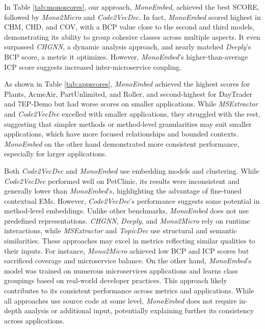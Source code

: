 In Table \ref{tab:monoscores}, our approach, \textit{MonoEmbed}, achieved the best SCORE, followed by \textit{Mono2Micro} and \textit{Code2VecDec}. In fact, \textit{MonoEmbed} scored highest in CHM, CHD, and COV, with a BCP value close to the second and third models, demonstrating its ability to group cohesive classes across multiple aspects. It even surpassed \textit{CHGNN}, a dynamic analysis approach, and nearly matched \textit{Deeply}'s BCP score, a metric it optimizes. However, \textit{MonoEmbed}'s higher-than-average ICP score suggests increased inter-microservice coupling. 


As shown in Table \ref{tab:appscores}, \textit{MonoEmbed} achieved the highest scores for Plants, AcmeAir, PartUnlimited, and Roller, and second-highest for DayTrader and 7EP-Demo but had worse scores on smaller applications. While \textit{MSExtractor} and \textit{Code2VecDec} excelled with smaller applications, they struggled with the rest, suggesting that simpler methods or method-level granularities may suit smaller applications, which have more focused relationships and bounded contexts. \textit{MonoEmbed} on the other hand demonstrated more consistent performance, especially for larger applications. 

Both \textit{Code2VecDec} and \textit{MonoEmbed} use embedding models and clustering. While \textit{Code2VecDec} performed well on PetClinic, its results were inconsistent and generally lower than \textit{MonoEmbed}'s, highlighting the advantage of fine-tuned contextual EMs. However, \textit{Code2VecDec}'s performance suggests some potential in method-level embeddings. Unlike other benchmarks, \textit{MonoEmbed} does not use predefined representations. \textit{CHGNN}, \textit{Deeply}, and \textit{Mono2Micro} rely on runtime interactions, while \textit{MSExtractor} and \textit{TopicDec} use structural and semantic similarities. These approaches may excel in metrics reflecting similar qualities to their inputs. For instance, \textit{Mono2Micro} achieved low BCP and ICP scores but sacrificed coverage and microservice balance. On the other hand, \textit{MonoEmbed}'s model was trained on numerous microservices applications and learns class groupings based on real-world developer practices. This approach likely contributes to its consistent performance across metrics and applications. While all approaches use source code at some level, \textit{MonoEmbed} does not require in-depth analysis or additional input, potentially explaining further its consistency across applications.

